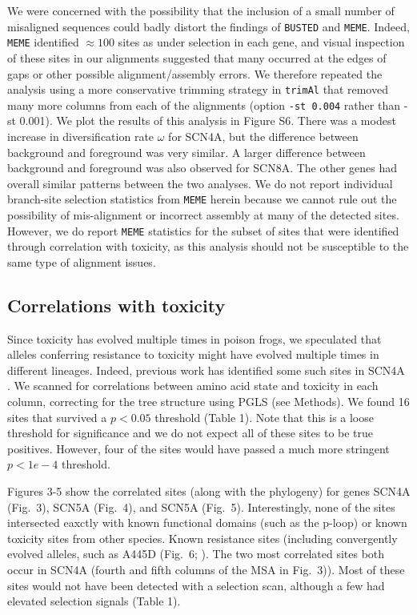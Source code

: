 \documentclass{article}
\begin{document}
We were concerned with the possibility that the inclusion of a small number of misaligned sequences could badly distort the findings of \texttt{BUSTED} and \texttt{MEME}. Indeed, \texttt{MEME} identified $\approx 100$ sites as under selection in each gene, and visual inspection of these sites in our alignments suggested that many occurred at the edges of gaps or other possible alignment/assembly errors. We therefore repeated the \citep{BUSTED} analysis using a more conservative trimming strategy in \texttt{trimAl} that removed many more columns from each of the alignments (option \texttt{-st 0.004} rather than {-st 0.001}). We plot the results of this analysis in Figure S6. There was a modest increase in diversification rate $\omega$ for SCN4A, but the difference between background and foreground was very similar. A larger difference between background and foreground was also observed for SCN8A. The other genes had overall similar patterns between the two analyses. We do not report individual branch-site selection statistics from \texttt{MEME} herein because we cannot rule out the possibility of mis-alignment or incorrect assembly at many of the detected sites. However, we do report \texttt{MEME} statistics for the subset of sites that were identified through correlation with toxicity, as this analysis should not be susceptible to the same type of alignment issues.

\subsection*{Correlations with toxicity}

Since toxicity has evolved multiple times in poison frogs, we speculated that alleles conferring resistance to toxicity might have evolved multiple times in different lineages. Indeed, previous work has identified some such sites in SCN4A \citep{tarvin2016convergent,tarvin2017interacting}. We scanned for correlations between amino acid state and toxicity in each column, correcting for the tree structure using PGLS (see Methods). We found 16 sites that survived a $p<0.05$ threshold (Table 1). Note that this is a loose threshold for significance and we do not expect all of these sites to be true positives. However, four of the sites would have passed a much more stringent $p < 1e-4$ threshold.

Figures 3-5 show the correlated sites (along with the phylogeny) for genes SCN4A (Fig.~3), SCN5A (Fig.~4), and SCN5A (Fig.~5). Interestingly, none of the sites intersected eaxctly with known functional domains (such as the p-loop) or known toxicity sites from other species. Known resistance sites (including convergently evolved alleles, such as A445D (Fig.~6; \cite{tarvin2016convergent}). The two most correlated sites both occur in SCN4A (fourth and fifth columns of the MSA in Fig.~3)). Most of these sites would not have been detected with a selection scan, although a few had elevated selection signals (Table 1). 
\end{document}
